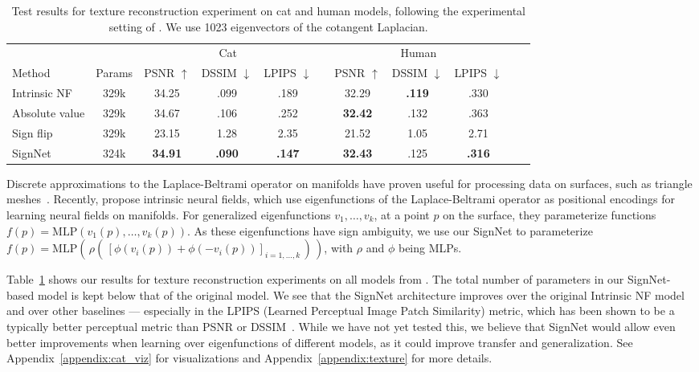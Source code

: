\documentclass{article} \usepackage{iclr2023_conference,times}
\newcommand{\mrm}[1]{\mathrm{#1}}
\begin{document}
\begin{table}
    \centering
    \caption{Test results for texture reconstruction experiment on cat and human models, following the experimental setting of \citep{koestler2022intrinsic}. We use 1023 eigenvectors of the cotangent Laplacian.}
    \label{tab:intrinsic_nf}
    {\small
    \begin{tabular}{lcccccccccc}
    \toprule
               & & \multicolumn{3}{c}{Cat} & & \multicolumn{3}{c}{Human}\\
                \cmidrule{3-5}  \cmidrule{7-9}
        Method & Params &  PSNR $\uparrow$ & DSSIM $\downarrow$ & LPIPS $\downarrow$ & &  PSNR $\uparrow$ & DSSIM $\downarrow$ & LPIPS $\downarrow$  \\
        \midrule
         Intrinsic NF & 329k & 34.25 & .099 & .189 & & 32.29 & \textbf{.119} & .330   \\
         Absolute value & 329k & 34.67 & .106 & .252 & & \textbf{32.42} & .132 & .363 \\
         Sign flip & 329k & 23.15 & 1.28 & 2.35 & & 21.52 & 1.05 & 2.71  \\
         SignNet & 324k & \textbf{34.91} & \textbf{.090} & \textbf{.147} & & \textbf{32.43} & .125 & \textbf{.316} \\
         \bottomrule
    \end{tabular}
    }
\end{table}

Discrete approximations to the Laplace-Beltrami operator on manifolds have proven useful for processing data on surfaces, such as triangle meshes~\citep{levy2006laplace}. Recently, \cite{koestler2022intrinsic} propose intrinsic neural fields, which use eigenfunctions of the Laplace-Beltrami operator as positional encodings for learning neural fields on manifolds. For generalized eigenfunctions $v_1, \ldots, v_k$, at a point $p$ on the surface, they parameterize functions $f(p) = \mrm{MLP}(v_1(p), \ldots, v_k(p))$. As these eigenfunctions have sign ambiguity, we use our SignNet to parameterize $f(p) = \mrm{MLP}(\, \rho(\, [\phi(v_i(p)) + \phi(-v_i(p))]_{i=1, \ldots, k}\,)\,)$, with $\rho$ and $\phi$ being MLPs.


Table~\ref{tab:intrinsic_nf} shows our results for texture reconstruction experiments on all models from \citet{koestler2022intrinsic}. The total number of parameters in our SignNet-based model is kept below that of the original model. We see that the SignNet architecture improves over the original Intrinsic NF model and over other baselines --- especially in the LPIPS (Learned Perceptual Image Patch Similarity) metric, which has been shown to be a typically better perceptual metric than PSNR or DSSIM~\citep{zhang2018unreasonable}. While we have not yet tested this, we believe that SignNet would allow even better improvements when learning over eigenfunctions of different models, as it could improve transfer and generalization. See Appendix~\ref{appendix:cat_viz} for visualizations and Appendix~\ref{appendix:texture} for more details.
\end{document}
